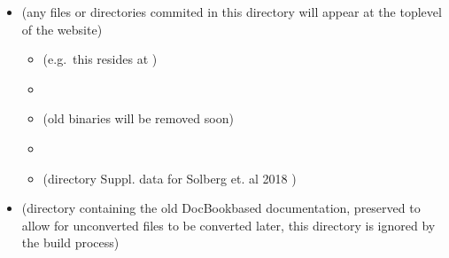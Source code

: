 \documentclass[letterpaper,10pt,english,openany,oneside]{sphinxmanual}
\begin{document}
\begin{itemize}
\begin{itemize}
\item {} 
\sphinxAtStartPar
{} (pulls in top\sphinxhyphen{}level  and , which is local to )

\item {} 
\sphinxAtStartPar
{}

\item {} 
\sphinxAtStartPar
{} (pulls in top\sphinxhyphen{}level )

\item {} 
\sphinxAtStartPar
{}

\end{itemize}

\item {} 
\sphinxAtStartPar
{} (any files or directories commited in this directory
will appear at the top\sphinxhyphen{}level of the website)
\begin{itemize}
\item {} 
\sphinxAtStartPar
{} (e.g. this resides at
)

\item {} 
\sphinxAtStartPar
{}

\item {} 
\sphinxAtStartPar
{} (old binaries \sphinxhyphen{} will be removed soon)

\item {} 
\sphinxAtStartPar
{}

\item {} 
\sphinxAtStartPar
{} (directory \sphinxhyphen{} Suppl. data for Solberg et. al 2018 \sphinxhyphen{}
)

\end{itemize}

\item {} 
\sphinxAtStartPar
{} (directory containing the old DocBook\sphinxhyphen{}based
documentation, preserved to allow for unconverted files to be
converted later, this directory is ignored by the build process)

\end{itemize}
\end{document}
